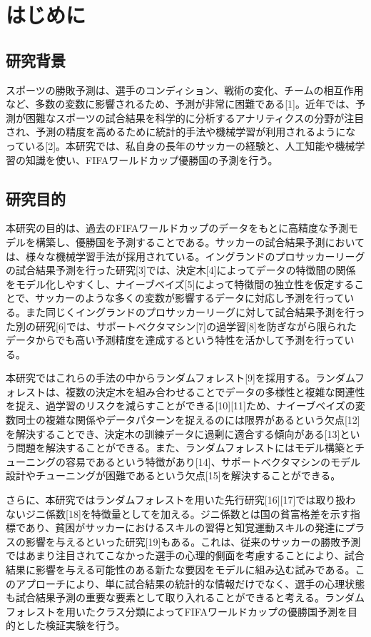 \documentclass[platex]{suribt}
\begin{document}
\mainmatter%
\chapter{はじめに}
\section{研究背景}
スポーツの勝敗予測は、選手のコンディション、戦術の変化、チームの相互作用など、多数の変数に影響されるため、予測が非常に困難である[1]。近年では、予測が困難なスポーツの試合結果を科学的に分析するアナリティクスの分野が注目され、予測の精度を高めるために統計的手法や機械学習が利用されるようになっている[2]。本研究では、私自身の長年のサッカーの経験と、人工知能や機械学習の知識を使い、FIFAワールドカップ優勝国の予測を行う。
\section{研究目的}
本研究の目的は、過去のFIFAワールドカップのデータをもとに高精度な予測モデルを構築し、優勝国を予測することである。サッカーの試合結果予測においては、様々な機械学習手法が採用されている。イングランドのプロサッカーリーグの試合結果予測を行った研究[3]では、決定木[4]によってデータの特徴間の関係をモデル化しやすくし、ナイーブベイズ[5]によって特徴間の独立性を仮定することで、サッカーのような多くの変数が影響するデータに対応し予測を行っている。また同じくイングランドのプロサッカーリーグに対して試合結果予測を行った別の研究[6]では、サポートベクタマシン[7]の過学習[8]を防ぎながら限られたデータからでも高い予測精度を達成するという特性を活かして予測を行っている。\par

本研究ではこれらの手法の中からランダムフォレスト[9]を採用する。ランダムフォレストは、複数の決定木を組み合わせることでデータの多様性と複雑な関連性を捉え、過学習のリスクを減らすことができる[10][11]ため、ナイーブベイズの変数同士の複雑な関係やデータパターンを捉えるのには限界があるという欠点[12]を解決することでき、決定木の訓練データに過剰に適合する傾向がある[13]という問題を解決することができる。また、ランダムフォレストにはモデル構築とチューニングの容易であるという特徴があり[14]、サポートベクタマシンのモデル設計やチューニングが困難であるという欠点[15]を解決することができる。\par

さらに、本研究ではランダムフォレストを用いた先行研究[16][17]では取り扱わないジニ係数[18]を特徴量としてを加える。ジニ係数とは国の貧富格差を示す指標であり、貧困がサッカーにおけるスキルの習得と知覚運動スキルの発達にプラスの影響を与えるといった研究[19]もある。これは、従来のサッカーの勝敗予測ではあまり注目されてこなかった選手の心理的側面を考慮することにより、試合結果に影響を与える可能性のある新たな要因をモデルに組み込む試みである。このアプローチにより、単に試合結果の統計的な情報だけでなく、選手の心理状態も試合結果予測の重要な要素として取り入れることができると考える。ランダムフォレストを用いたクラス分類によってFIFAワールドカップの優勝国予測を目的とした検証実験を行う。
\end{document}
